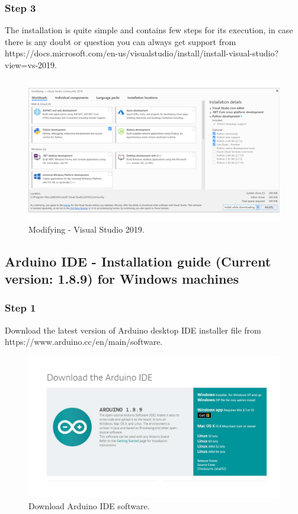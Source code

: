 \begin{refsection}
	
	
	\subsubsection{Step 3}
	
	The installation is quite simple and contains few steps for its execution, in case there is any doubt or question you can always get support from https://docs.microsoft.com/en-us/visualstudio/install/install-visual-studio?view=vs-2019.
	
	\begin{figure}[H]
		\centering
		\includegraphics[width=1\linewidth]{./sdf/arduino_quantum_rx/figures/VSworkloads.pdf}
		\caption{Modifying - Visual Studio 2019.}
		\label{vstudioWorkloads}
	\end{figure}
	
	\subsection{Arduino IDE - Installation guide (Current version: 1.8.9) for Windows machines}
	
	\subsubsection{Step 1}
	
	Download the latest version of Arduino desktop IDE installer file from https://www.arduino.cc/en/main/software.
	
	\begin{figure}[H]
		\centering
		\includegraphics[width=0.86\linewidth]{./sdf/arduino_quantum_rx/figures/arduinoDownload.pdf}
		\caption{Download Arduino IDE software.}
		\label{arduinoDownload}
	\end{figure}
	

\end{refsection}
